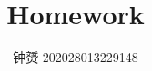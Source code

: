 \documentclass{article} %
\title{Homework }
\author{钟赟 202028013229148}
\begin{document}
\begin{CJK*}{GBK}{song}

\maketitle
%


%
% 
%
\end{CJK*}
\end{document}
